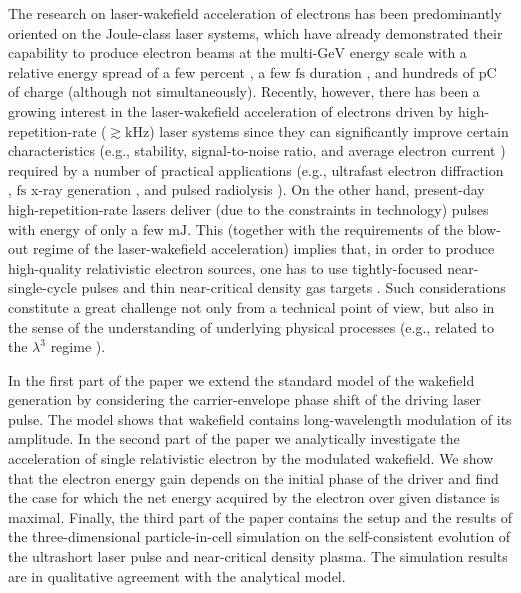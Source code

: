 \documentclass[10pt, twoside, a4paper, openright]{report}
\begin{document}
The research on laser-wakefield acceleration of electrons has been predominantly oriented on the Joule-class laser systems, which have already demonstrated their capability to produce electron beams at the multi-$ \mathrm{GeV} $ energy scale with a relative energy spread of a few percent \cite{Kim2013, Gonsalves2019}, a few $ \mathrm{fs} $ duration \cite{Tilborg2006, Ohkubo2007, Debus2010, Lundh2011}, and hundreds of $ \mathrm{pC} $ of charge \cite{Li2017, Couperus2017} (although not simultaneously). Recently, however, there has been a growing interest in the laser-wakefield acceleration of electrons driven by high-repetition-rate ($ \gtrsim \mathrm{kHz} $) laser systems since they can significantly improve certain characteristics (e.g., stability, signal-to-noise ratio, and average electron current \cite{Faure2018}) required by a number of practical applications (e.g., ultrafast electron diffraction \cite{Sciaini2011, Miller2014}, $ \mathrm{fs} $ x-ray generation \cite{TaPhuoc2012, Corde2013}, and pulsed radiolysis \cite{Muroya2008}). On the other hand, present-day high-repetition-rate lasers deliver (due to the constraints in technology) pulses with energy of only a few $ \mathrm{mJ} $. This (together with the requirements of the blow-out regime of the laser-wakefield acceleration) implies that, in order to produce high-quality relativistic electron sources, one has to use tightly-focused near-single-cycle pulses and thin near-critical density gas targets \cite{Faure2018, Salehi2019}. Such considerations constitute a great challenge not only from a technical point of view, but also in the sense of the understanding of underlying physical processes (e.g., related to the $ \lambda^{3} $ regime \cite{Mourou2002}).

In the first part of the paper we extend the standard model of the wakefield generation by considering the carrier-envelope phase shift of the driving laser pulse. The model shows that wakefield contains long-wavelength modulation of its amplitude. In the second part of the paper we analytically investigate the acceleration of single relativistic electron by the modulated wakefield. We show that the electron energy gain depends on the initial phase of the driver and find the case for which the net energy acquired by the electron over given distance is maximal. Finally, the third part of the paper contains the setup and the results of the three-dimensional particle-in-cell simulation on the self-consistent evolution of the ultrashort laser pulse and near-critical density plasma. The simulation results are in qualitative agreement with the analytical model.
\end{document}
